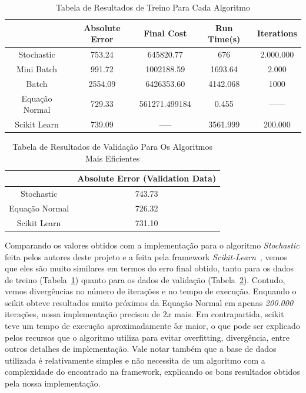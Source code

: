 \documentclass[conference]{IEEEtran}
\begin{document}
\begin{table}[H]
\centering
\begin{tabular}{|c|c|c|c|c|}
\hline
               & Absolute Error & Final Cost    & Run Time(s) & Iterations \\ \hline
Stochastic     & 753.24      & 645820.77     & 676         & 2.000.000  \\ \hline
Mini Batch     & 991.72      & 1002188.59    & 1693.64     & 2.000      \\ \hline
Batch          & 2554.09     & 6426353.60    & 4142.068    & 1000       \\ \hline
Equação Normal & 729.33      & 561271.499184 & 0.455       & ------     \\ \hline
Scikit Learn   & 739.09      & -----         & 3561.999    & 200.000    \\ \hline
\end{tabular}
\caption{Tabela de Resultados de Treino Para Cada Algoritmo}
\label{table:results_train}
\end{table}

\begin{table}[H]
\centering
\begin{tabular}{|c|c|}
\hline
               & Absolute Error (Validation Data) \\ \hline
Stochastic     & 743.73                        \\ \hline
Equação Normal & 726.32                        \\ \hline
Scikit Learn   & 731.10                        \\ \hline
\end{tabular}
\caption{Tabela de Resultados de Validação Para Os Algoritmos Mais Eficientes}
\label{table:results_test}
\end{table}

Comparando os valores obtidos com a implementação para o algoritmo \textit{Stochastic} feita pelos autores deste projeto e a feita pela framework \textit{Scikit-Learn}~\cite{scikit}, vemos que eles são muito similares em termos do erro final obtido, tanto para os dados de treino (Tabela~\ref{table:results_train}) quanto para os dados de validação (Tabela~\ref{table:results_test}). Contudo, vemos divergências no número de iterações e no tempo de execução. Enquando o scikit obteve resultados muito próximos da Equação Normal em apenas \textit{200.000} iterações, nossa implementação precisou de $2x$ mais. Em contrapartida, scikit teve um tempo de execução aproximadamente $5x$ maior, o que pode ser explicado pelos recursos que o algoritmo utiliza para evitar overfitting, divergência, entre outros detalhes de implementação. Vale notar também que a base de dados utilizada é relativamente simples e não necessita de um algoritmo com a complexidade do encontrado na framework, explicando os bons resultados obtidos pela nossa implementação.
\end{document}
